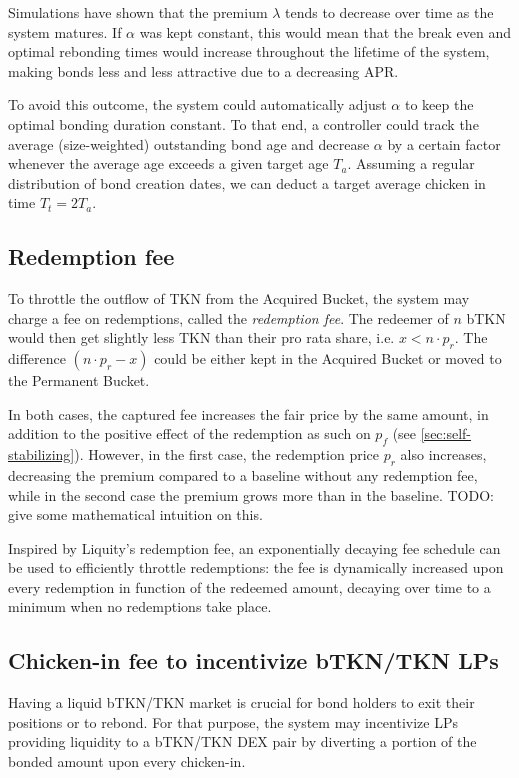 \documentclass{article}
\begin{document}
Simulations have shown that the premium $\lambda$ tends to decrease over time as the system matures. If  $\alpha$ was kept constant, this would mean that the break even and optimal rebonding times would increase throughout the lifetime of the system, making bonds less and less attractive due to a decreasing APR.

To avoid this outcome, the system could automatically adjust $\alpha$ to keep the optimal bonding duration constant. To that end, a controller could track the average (size-weighted) outstanding bond age and decrease $\alpha$ by a certain factor whenever the average age exceeds a given target age $T_a$. Assuming a regular distribution of bond creation dates, we can deduct a target average chicken in time $T_t = 2T_a$.

\subsection{Redemption fee}
  \label{sec:redemption-fee}
To throttle the outflow of TKN from the Acquired Bucket, the system may charge a fee on redemptions, called the \textit{redemption fee}. The redeemer of $n$ bTKN would then get slightly less TKN than their pro rata share, i.e. $x < n \cdot p_r$. The difference $(n \cdot p_r - x)$ could be either kept in the Acquired Bucket or moved to the Permanent Bucket. 

In both cases, the captured fee increases the fair price by the same amount, in addition to the positive effect of the redemption as such on $p_f$ (see \ref{sec:self-stabilizing}). However, in the first case, the redemption price $p_r$ also increases, decreasing the premium compared to a baseline without any redemption fee, while in the second case the premium grows more than in the baseline. TODO: give some mathematical intuition on this.

Inspired by Liquity's redemption fee, an exponentially decaying fee schedule can be used to efficiently throttle redemptions: the fee is dynamically increased upon every redemption in function of the redeemed amount, decaying over time to a minimum when no redemptions take place.

\subsection{Chicken-in fee to incentivize bTKN/TKN LPs}
  \label{sec:chicken-in-fee}
Having a liquid bTKN/TKN market is crucial for bond holders to exit their positions or to rebond.
For that purpose, the system may incentivize LPs providing liquidity to a bTKN/TKN DEX pair by diverting a portion of the bonded amount upon every chicken-in. 
\end{document}
